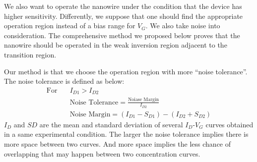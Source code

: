 We also want to operate the nanowire under the condition that the device has higher sensitivity.
Differently, we suppose that one should find the appropriate operation region instead of a bias range for $V_G$.
We also take noise into consideration.
The comprehensive method we proposed below proves that the nanowire should be operated in the weak inversion region adjacent to the transition region.

Our method is that we choose the operation region with more ``noise tolerance''.
The noise tolerance is defined as below:
\setlength{\mathindent}{2cm}
\begin{align}
    \text{For} \quad & I_{D1} > I_{D2} \\
    & \text{Noise Tolerance} = \frac{\text{Noiase Margin}}{I_{D2}} \\
    & \text{Noise Margin} = (I_{D1} - S_{D1}) - (I_{D2} + S_{D2})
\end{align}
$I_D$ and $SD$ are the mean and standard deviation of several $I_D$-$V_G$ curves obtained in a same experimental condition.
The larger the noise tolerance implies there is more space between two curves.
And more space implies the less chance of overlapping that may happen between two concentration curves.



